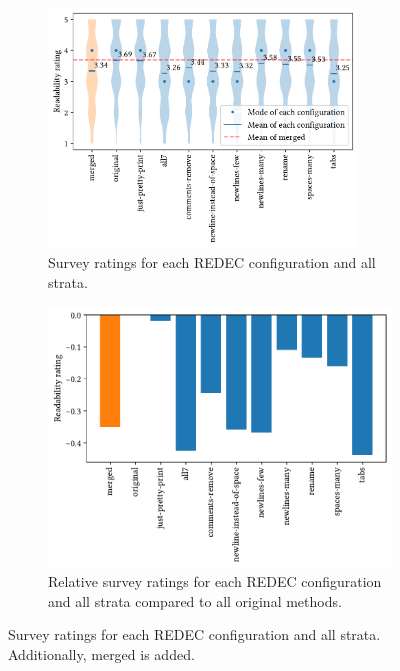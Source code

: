 \documentclass[%
class=scrreprt,
chapterprefix=false,%
open=right,%
twoside=true,%
paper=a4,%
logofile={Logo\_zentral\_farbig\_EN.png},%
thesistype=master,%
UKenglish,%
]{se2thesis}
\theoremstyle{definition}
\newcommand{\rdh}{REDEC\xspace}
\begin{document}
	\begin{figure}[p]
		\centering
		\begin{subfigure}{\linewidth}
			\includegraphics[width=0.9\textwidth]{img/survey_ratings_violin_all.pdf}
			\caption{Survey ratings for each \rdh configuration and all strata.}
			\label{fig:survey_ratings_violin_all}
		\end{subfigure}
		\hfill
		\begin{subfigure}{\textwidth}
			\includegraphics[width=0.9\linewidth]{img/survey_ratings_bar_all.pdf}
			\caption{Relative survey ratings for each \rdh configuration and all strata compared to all original methods.}
			\label{fig:survey_ratings_bar_all}
		\end{subfigure}
		\caption{Survey ratings for each \rdh configuration and all strata. Additionally, merged is added.}
		\label{fig:survey_time_all}
	\end{figure}
		
\end{document}

